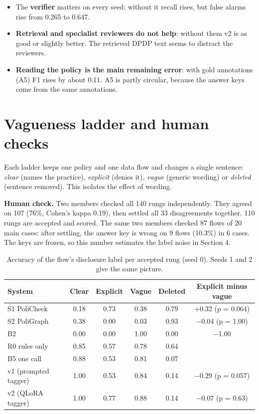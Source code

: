\documentclass[11pt,a4paper]{article}
\begin{document}
\begin{itemize}
  \item The \textbf{verifier} matters on every seed: without it recall rises, but false alarms
        rise from 0.265 to 0.647.
  \item \textbf{Retrieval and specialist reviewers do not help}: without them v2 is as good or
        slightly better. The retrieved DPDP text seems to distract the reviewers.
  \item \textbf{Reading the policy is the main remaining error}: with gold annotations (A5) F1 rises
        by about 0.11. A5 is partly circular, because the answer keys come from the same
        annotations.
\end{itemize}

\section{Vagueness ladder and human checks}

Each ladder keeps one policy and one data flow and changes a single sentence: \emph{clear} (names
the practice), \emph{explicit} (denies it), \emph{vague} (generic wording) or \emph{deleted}
(sentence removed). This isolates the effect of wording.

\textbf{Human check.} Two members checked all 140 rungs independently. They agreed on 107 (76\%,
Cohen's kappa 0.19), then settled all 33 disagreements together. 110 rungs are accepted and scored.
The same two members checked 87 flows of 20 main cases: after settling, the answer key is wrong on
9 flows (10.3\%) in 6 cases. The keys are frozen, so this number estimates the label noise in
Section 4.

\begin{table}[H]
\centering
\small
\begin{tabular}{lccccc}
\toprule
System & Clear & Explicit & Vague & Deleted & Explicit minus vague \\
\midrule
S1 PoliCheck & 0.18 & 0.73 & 0.38 & 0.79 & +0.32 (p = 0.064) \\
S2 PoliGraph & 0.38 & 0.00 & 0.03 & 0.93 & $-$0.04 (p = 1.00) \\
B2 & 0.00 & 0.00 & 1.00 & 0.00 & $-$1.00 \\
R0 rules only & 0.85 & 0.57 & 0.78 & 0.64 & \\
B5 one call & 0.88 & 0.53 & 0.81 & 0.07 & \\
v1 (prompted tagger) & 1.00 & 0.53 & 0.84 & 0.14 & $-$0.29 (p = 0.057) \\
v2 (QLoRA tagger) & 1.00 & 0.77 & 0.88 & 0.14 & $-$0.07 (p = 0.63) \\
\bottomrule
\end{tabular}
\caption{Accuracy of the flow's disclosure label per accepted rung (seed 0). Seeds 1 and 2 give the
same picture.}
\end{table}
\end{document}
